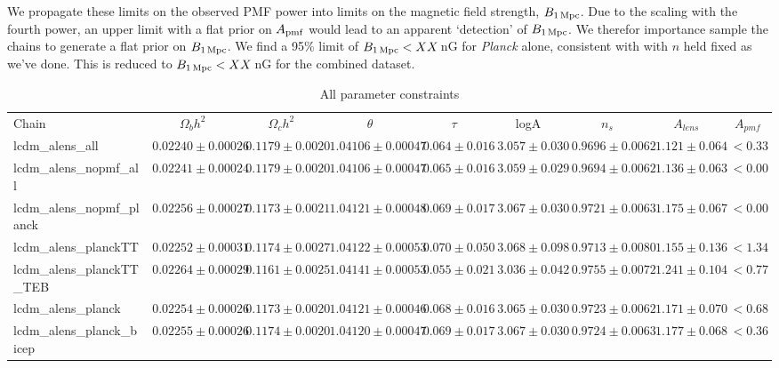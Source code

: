 \documentclass[preprint]{emulateapj}
\newcommand{\apmf}{\ensuremath{A_{\rm pmf}}}
\newcommand{\bpmf}{\ensuremath{B_{\rm 1\,Mpc}}}
\newcommand{\planck}{{\sl Planck}}
\begin{document}
We propagate these limits on the observed PMF power into limits on the magnetic field strength, \bpmf. 
Due to the scaling with the fourth power, an upper limit with a flat prior on \apmf{} would lead to an apparent `detection' of \bpmf. 
We therefor importance sample the chains to generate a flat prior on \bpmf. 
We find a 95\% limit of $\bpmf < XX$\,nG for \planck{} alone, consistent with \citep{planckpmf} with $n$ held fixed as we've done. 
This is reduced to $\bpmf < XX$\,nG for the combined dataset. 











\begin{table*}[h]
\begin{center}
\caption{\label{tab:param_all} All parameter constraints}
\tiny
\begin{tabular}{l || c c c c c c c | c}
Chain & $\Omega_b h^2$  & $\Omega_c h^2$  & $\theta$  & $\tau$  & logA  & $n_s$  & $A_{lens}$  & $A_{pmf}$ \\
lcdm\_alens\_all & $ 0.02240\pm  0.00026$ & $ 0.1179\pm  0.0020$ & $ 1.04106\pm  0.00047$ & $ 0.064\pm  0.016$ & $ 3.057\pm  0.030$ & $ 0.9696\pm  0.0062$ & $ 1.121 \pm  0.064$ & $< 0.33$ \\
lcdm\_alens\_nopmf\_all & $ 0.02241\pm  0.00024$ & $ 0.1179\pm  0.0020$ & $ 1.04106\pm  0.00047$ & $ 0.065\pm  0.016$ & $ 3.059\pm  0.029$ & $ 0.9694\pm  0.0062$ & $ 1.136 \pm  0.063$ & $< 0.00$ \\
lcdm\_alens\_nopmf\_planck & $ 0.02256\pm  0.00027$ & $ 0.1173\pm  0.0021$ & $ 1.04121\pm  0.00048$ & $ 0.069\pm  0.017$ & $ 3.067\pm  0.030$ & $ 0.9721\pm  0.0063$ & $ 1.175 \pm  0.067$ & $< 0.00$ \\
lcdm\_alens\_planckTT & $ 0.02252\pm  0.00031$ & $ 0.1174\pm  0.0027$ & $ 1.04122\pm  0.00053$ & $ 0.070\pm  0.050$ & $ 3.068\pm  0.098$ & $ 0.9713\pm  0.0080$ & $ 1.155 \pm  0.136$ & $< 1.34$ \\
lcdm\_alens\_planckTT\_TEB & $ 0.02264\pm  0.00029$ & $ 0.1161\pm  0.0025$ & $ 1.04141\pm  0.00053$ & $ 0.055\pm  0.021$ & $ 3.036\pm  0.042$ & $ 0.9755\pm  0.0072$ & $ 1.241 \pm  0.104$ & $< 0.77$ \\
lcdm\_alens\_planck & $ 0.02254\pm  0.00026$ & $ 0.1173\pm  0.0020$ & $ 1.04121\pm  0.00046$ & $ 0.068\pm  0.016$ & $ 3.065\pm  0.030$ & $ 0.9723\pm  0.0062$ & $ 1.171 \pm  0.070$ & $< 0.68$ \\
lcdm\_alens\_planck\_bicep & $ 0.02255\pm  0.00026$ & $ 0.1174\pm  0.0020$ & $ 1.04120\pm  0.00047$ & $ 0.069\pm  0.017$ & $ 3.067\pm  0.030$ & $ 0.9724\pm  0.0063$ & $ 1.177 \pm  0.068$ & $< 0.36$ \\

\end{tabular}
\end{center}
\end{table*}
\end{document}
